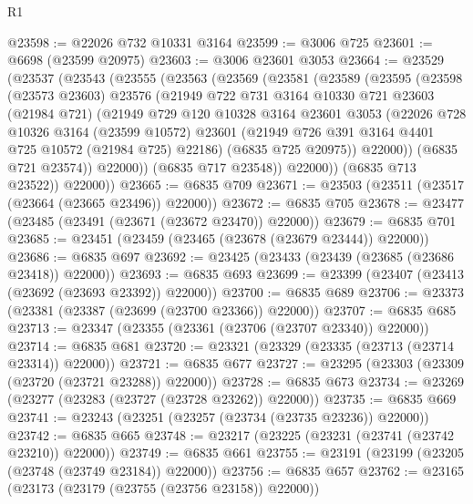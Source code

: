 \begin{lexlean}{R1}
\begin{coremodule}
@23598 := @22026 @732 @10331 @3164
@23599 := @3006 @725
@23601 := @6698 (@23599 @20975)
@23603 := @3006 @23601 @3053
@23664 := @23529
    (@23537
      (@23543
        (@23555
          (@23563
            (@23569
              (@23581
                (@23589
                  (@23595
                    (@23598
                      (@23573 @23603)
                      @23576
                      (@21949
                        @722
                        @731
                        @3164
                        @10330
                        @721
                        @23603
                        (@21984 @721)
                        (@21949
                          @729
                          @120
                          @10328
                          @3164
                          @23601
                          @3053
                          (@22026
                            @728
                            @10326
                            @3164
                            (@23599 @10572)
                            @23601
                            (@21949 @726 @391 @3164 @4401 @725 @10572 (@21984 @725) @22186)
                            (@6835 @725 @20975))
                          @22000))
                      (@6835 @721 @23574))
                    @22000))
                (@6835 @717 @23548))
              @22000))
          (@6835 @713 @23522))
        @22000))
@23665 := @6835 @709
@23671 := @23503 (@23511 (@23517 (@23664 (@23665 @23496)) @22000))
@23672 := @6835 @705
@23678 := @23477 (@23485 (@23491 (@23671 (@23672 @23470)) @22000))
@23679 := @6835 @701
@23685 := @23451 (@23459 (@23465 (@23678 (@23679 @23444)) @22000))
@23686 := @6835 @697
@23692 := @23425 (@23433 (@23439 (@23685 (@23686 @23418)) @22000))
@23693 := @6835 @693
@23699 := @23399 (@23407 (@23413 (@23692 (@23693 @23392)) @22000))
@23700 := @6835 @689
@23706 := @23373 (@23381 (@23387 (@23699 (@23700 @23366)) @22000))
@23707 := @6835 @685
@23713 := @23347 (@23355 (@23361 (@23706 (@23707 @23340)) @22000))
@23714 := @6835 @681
@23720 := @23321 (@23329 (@23335 (@23713 (@23714 @23314)) @22000))
@23721 := @6835 @677
@23727 := @23295 (@23303 (@23309 (@23720 (@23721 @23288)) @22000))
@23728 := @6835 @673
@23734 := @23269 (@23277 (@23283 (@23727 (@23728 @23262)) @22000))
@23735 := @6835 @669
@23741 := @23243 (@23251 (@23257 (@23734 (@23735 @23236)) @22000))
@23742 := @6835 @665
@23748 := @23217 (@23225 (@23231 (@23741 (@23742 @23210)) @22000))
@23749 := @6835 @661
@23755 := @23191 (@23199 (@23205 (@23748 (@23749 @23184)) @22000))
@23756 := @6835 @657
@23762 := @23165 (@23173 (@23179 (@23755 (@23756 @23158)) @22000))

\end{coremodule}
\end{lexlean}
